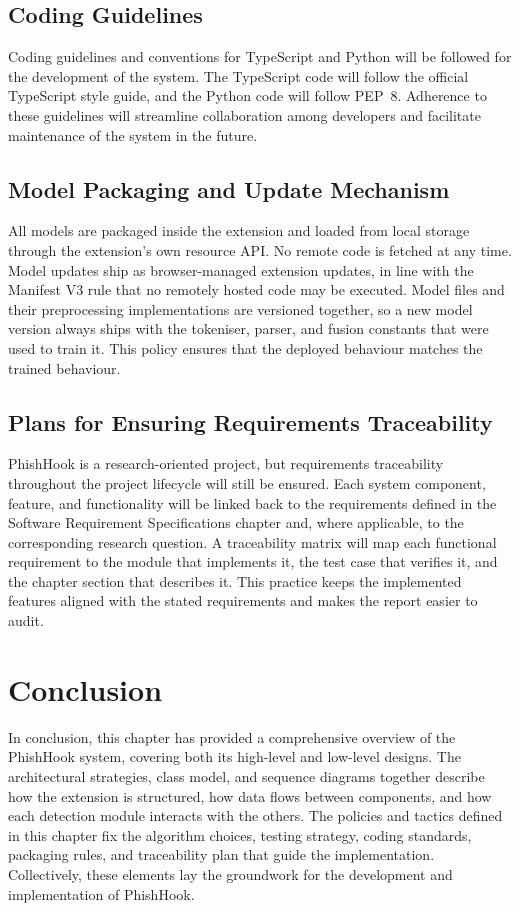 \documentclass{FastFyp}
\begin{document}
\subsection{Coding Guidelines}
Coding guidelines and conventions for TypeScript and Python will be followed for the development of the system. The TypeScript code will follow the official TypeScript style guide, and the Python code will follow PEP~8. Adherence to these guidelines will streamline collaboration among developers and facilitate maintenance of the system in the future.

\subsection{Model Packaging and Update Mechanism}
All models are packaged inside the extension and loaded from local storage through the extension's own resource API. No remote code is fetched at any time. Model updates ship as browser-managed extension updates, in line with the Manifest V3 rule that no remotely hosted code may be executed. Model files and their preprocessing implementations are versioned together, so a new model version always ships with the tokeniser, parser, and fusion constants that were used to train it. This policy ensures that the deployed behaviour matches the trained behaviour.

\subsection{Plans for Ensuring Requirements Traceability}
PhishHook is a research-oriented project, but requirements traceability throughout the project lifecycle will still be ensured. Each system component, feature, and functionality will be linked back to the requirements defined in the Software Requirement Specifications chapter and, where applicable, to the corresponding research question. A traceability matrix will map each functional requirement to the module that implements it, the test case that verifies it, and the chapter section that describes it. This practice keeps the implemented features aligned with the stated requirements and makes the report easier to audit.

\section{Conclusion}
\label{sec:design-conclusion}
In conclusion, this chapter has provided a comprehensive overview of the PhishHook system, covering both its high-level and low-level designs. The architectural strategies, class model, and sequence diagrams together describe how the extension is structured, how data flows between components, and how each detection module interacts with the others. The policies and tactics defined in this chapter fix the algorithm choices, testing strategy, coding standards, packaging rules, and traceability plan that guide the implementation. Collectively, these elements lay the groundwork for the development and implementation of PhishHook.

{


}
\end{document}
